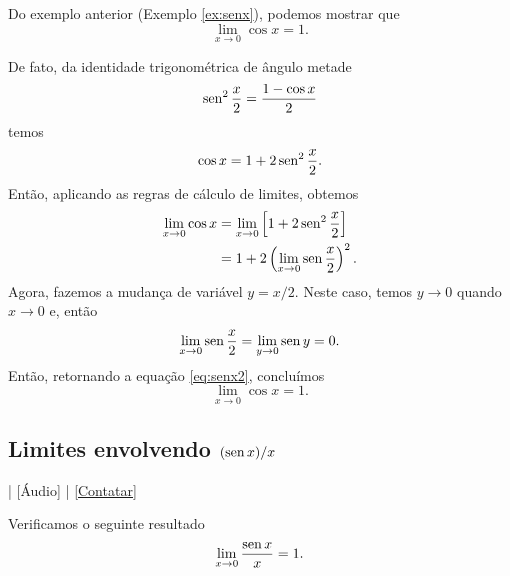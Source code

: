 \begin{obs}
  Do exemplo anterior (Exemplo \ref{ex:senx}), podemos mostrar que
\begin{equation}
  \lim_{x\to 0} \cos x = 1.
\end{equation}

De fato, da identidade trigonométrica de ângulo metade
\begin{equation}
  \operatorname{sen}^2 \frac{x}{2} = \frac{1 - \cos x}{2}
\end{equation}
temos
\begin{equation}
  \cos x = 1 + 2\operatorname{sen}^2 \frac{x}{2}.
\end{equation}
Então, aplicando as regras de cálculo de limites, obtemos
\begin{align}
  \lim_{x\to 0} \cos x &= \lim_{x\to 0} \left[1 + 2\operatorname{sen}^2 \frac{x}{2}\right] \\
                       &= 1 + 2\left(\lim_{x\to 0} \operatorname{sen} \frac{x}{2}\right)^2.\label{eq:senx2}
\end{align}
Agora, fazemos a mudança de variável $y = x/2$. Neste caso, temos $y\to 0$ quando $x\to 0$ e, então
\begin{equation}
  \lim_{x\to 0} \operatorname{sen} \frac{x}{2} = \lim_{y\to 0} \operatorname{sen} y = 0.
\end{equation}
Então, retornando a equação \eqref{eq:senx2}, concluímos
\begin{equation}
  \lim_{x\to 0} \cos x = 1.
\end{equation}
\end{obs}

\subsection{Limites envolvendo $(\operatorname{sen} x)/x$}\label{sec:lim_senx_x}

\begin{flushright}
  [Vídeo] | [Áudio] | \href{https://phkonzen.github.io/notas/contato.html}{[Contatar]}
\end{flushright}

Verificamos o seguinte resultado
\begin{equation}\label{eq:lim_senx_x}
  \lim_{x\to 0} \frac{\operatorname{sen} x}{x} = 1.
\end{equation}

